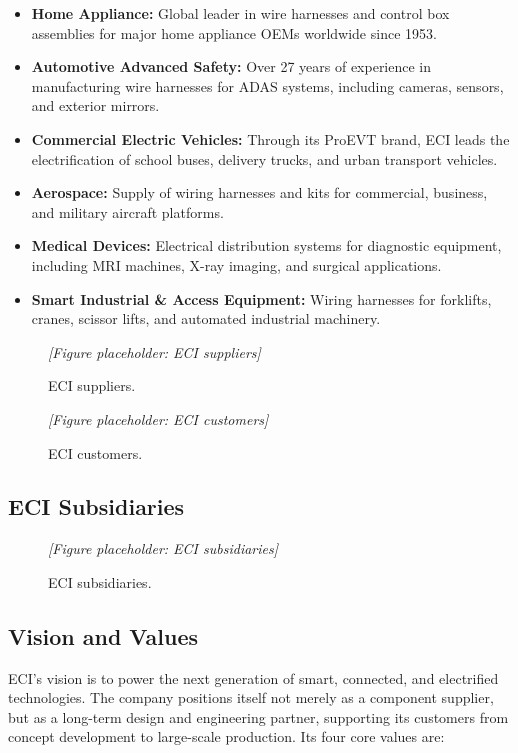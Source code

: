 \begin{itemize}
  \item \textbf{Home Appliance:} Global leader in wire harnesses and control box assemblies for major home appliance OEMs worldwide since 1953.
  \item \textbf{Automotive Advanced Safety:} Over 27 years of experience in manufacturing wire harnesses for ADAS systems, including cameras, sensors, and exterior mirrors.
  \item \textbf{Commercial Electric Vehicles:} Through its ProEVT brand, ECI leads the electrification of school buses, delivery trucks, and urban transport vehicles.
  \item \textbf{Aerospace:} Supply of wiring harnesses and kits for commercial, business, and military aircraft platforms.
  \item \textbf{Medical Devices:} Electrical distribution systems for diagnostic equipment, including MRI machines, X-ray imaging, and surgical applications.
  \item \textbf{Smart Industrial \& Access Equipment:} Wiring harnesses for forklifts, cranes, scissor lifts, and automated industrial machinery.
\end{itemize}

\begin{figure}[H]
  \centering
  \textit{[Figure placeholder: ECI suppliers]}
  \caption{ECI suppliers.}
  \label{fig:eci-suppliers}
\end{figure}

\begin{figure}[H]
  \centering
  \textit{[Figure placeholder: ECI customers]}
  \caption{ECI customers.}
  \label{fig:eci-customers}
\end{figure}

\subsection{ECI Subsidiaries}

\begin{figure}[H]
  \centering
  \textit{[Figure placeholder: ECI subsidiaries]}
  \caption{ECI subsidiaries.}
  \label{fig:eci-subsidiaries}
\end{figure}

\subsection{Vision and Values}

ECI's vision is to power the next generation of smart, connected, and electrified technologies. The company positions itself not merely as a component supplier, but as a long-term design and engineering partner, supporting its customers from concept development to large-scale production. Its four core values are:

